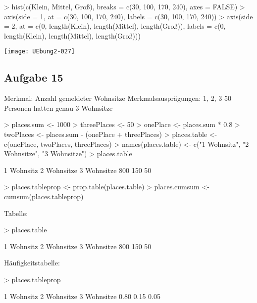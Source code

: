 \documentclass{article}
\begin{document}
\begin{Schunk}
\begin{Sinput}
> hist(c(Klein, Mittel, Groß), breaks = c(30, 100, 170, 240), axes = FALSE)
> axis(side = 1, at = c(30, 100, 170, 240), labels = c(30, 100, 170, 240))
> axis(side = 2, at = c(0, length(Klein), length(Mittel), length(Groß)), labels = c(0, length(Klein), length(Mittel), length(Groß)))
\end{Sinput}
\end{Schunk}
\texttt{[image: UEbung2-027]}

\subsection{Aufgabe 15}

Merkmal: Anzahl gemeldeter Wohnsitze
Merkmalsausprägungen: 1, 2, 3
50 Personen hatten genau 3 Wohnsitze

\begin{Schunk}
\begin{Sinput}
> places.sum <- 1000
> threePlaces <- 50
> onePlace <- places.sum * 0.8
> twoPlaces <- places.sum - (onePlace + threePlaces)
> places.table <- c(onePlace, twoPlaces, threePlaces)
> names(places.table) <- c("1 Wohnsitz", "2 Wohnsitze", "3 Wohnsitze")
> places.table
\end{Sinput}
\begin{Soutput}
 1 Wohnsitz 2 Wohnsitze 3 Wohnsitze 
        800         150          50 
\end{Soutput}
\begin{Sinput}
> places.tableprop <- prop.table(places.table)
> places.cumsum <- cumsum(places.tableprop)
\end{Sinput}
\end{Schunk}

Tabelle:
\begin{Schunk}
\begin{Sinput}
> places.table
\end{Sinput}
\begin{Soutput}
 1 Wohnsitz 2 Wohnsitze 3 Wohnsitze 
        800         150          50 
\end{Soutput}
\end{Schunk}

Häufigkeitstabelle:
\begin{Schunk}
\begin{Sinput}
> places.tableprop
\end{Sinput}
\begin{Soutput}
 1 Wohnsitz 2 Wohnsitze 3 Wohnsitze 
       0.80        0.15        0.05 
\end{Soutput}
\end{Schunk}
\end{document}
